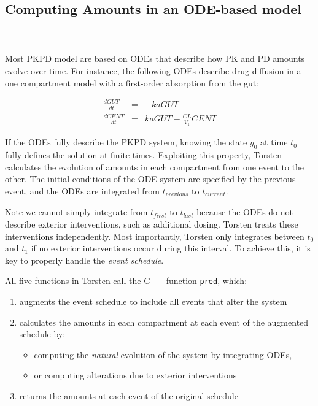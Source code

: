 \documentclass[11pt]{amsart}
\begin{document}
\subsection{Computing Amounts in an ODE-based model} \ \\ \ \\
Most PKPD model are based on ODEs that describe how PK and PD amounts evolve over time. For instance, the following ODEs describe drug diffusion in a one compartment model with a first-order absorption from the gut:

\begin{eqnarray*}
\frac{dGUT}{dt} &=& -kaGUT \\ 
\frac{dCENT}{dt} &=& kaGUT - \frac{CL}{V_{1}}CENT
\end{eqnarray*}

If the ODEs fully describe the PKPD system, knowing the state $y_0$ at time $t_0$ fully defines the solution at finite times. Exploiting this property, Torsten calculates the evolution of amounts in each compartment from one event to the other. The initial conditions of the ODE system are specified by the previous event, and the ODEs are integrated from $t_{previous} $ to $t_{current}$. 

Note we cannot simply integrate from $t_{first}$ to $t_{last}$ because the ODEs do not describe exterior interventions, such as additional dosing. Torsten treats these interventions independently. Most importantly, Torsten only integrates between $t_0$ and $t_1$ if no exterior interventions occur during this interval. To achieve this, it is key to properly handle the \textit{event schedule}. 

All five functions in Torsten call the C++ function \texttt{pred}, which:
\begin{enumerate}
  \item augments the event schedule to include all events that alter the system
  \item calculates the amounts in each compartment at each event of the augmented schedule by:
  \begin{itemize}
    \item computing the \textit{natural} evolution of the system by integrating ODEs,
    \item or computing alterations due to exterior interventions
  \end{itemize}
  \item returns the amounts at each event of the original schedule
\end{enumerate}
\end{document}

